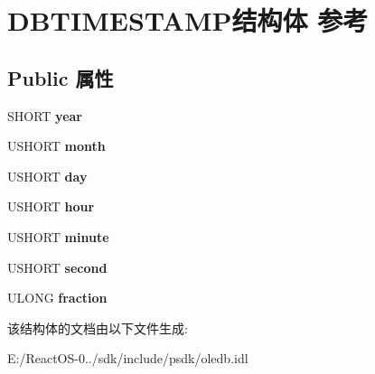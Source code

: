 \hypertarget{struct_d_b_t_i_m_e_s_t_a_m_p}{}\section{D\+B\+T\+I\+M\+E\+S\+T\+A\+M\+P结构体 参考}
\label{struct_d_b_t_i_m_e_s_t_a_m_p}
\subsection*{Public 属性}
\begin{DoxyCompactItemize}
\item 
\mbox{\label{struct_d_b_t_i_m_e_s_t_a_m_p_a0e2e1c995d6746c7fb0c39264b7f468c}} 
S\+H\+O\+RT {\bfseries year}
\item 
\mbox{\label{struct_d_b_t_i_m_e_s_t_a_m_p_a06166a0d283121ad176f6676f9c8791d}} 
U\+S\+H\+O\+RT {\bfseries month}
\item 
\mbox{\label{struct_d_b_t_i_m_e_s_t_a_m_p_ac8f4fae401642d944d59cf42a8b9c389}} 
U\+S\+H\+O\+RT {\bfseries day}
\item 
\mbox{\label{struct_d_b_t_i_m_e_s_t_a_m_p_ad083184f7bb0898e89d2d4efc0e078b7}} 
U\+S\+H\+O\+RT {\bfseries hour}
\item 
\mbox{\label{struct_d_b_t_i_m_e_s_t_a_m_p_ae8116311e6edf44325fefcfc92cdbbc9}} 
U\+S\+H\+O\+RT {\bfseries minute}
\item 
\mbox{\label{struct_d_b_t_i_m_e_s_t_a_m_p_a450612d9f8b191c74f7eeb9832640eae}} 
U\+S\+H\+O\+RT {\bfseries second}
\item 
\mbox{\label{struct_d_b_t_i_m_e_s_t_a_m_p_ac48ab0993bc1f29b36bfb082e64eac92}} 
U\+L\+O\+NG {\bfseries fraction}
\end{DoxyCompactItemize}


该结构体的文档由以下文件生成\+:\begin{DoxyCompactItemize}
\item 
E\+:/\+React\+O\+S-\/0../sdk/include/psdk/oledb.\+idl\end{DoxyCompactItemize}
